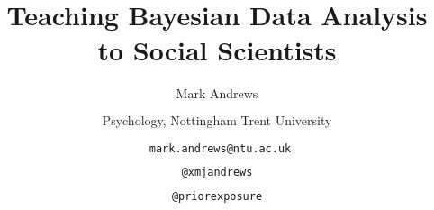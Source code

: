 \documentclass{slides}
\title[Teaching Bayes]{Teaching Bayesian Data Analysis to Social Scientists}
\author[Andrews]{Mark Andrews \\ $\phantom{foo}$ \\ Psychology, Nottingham Trent University \\ $\phantom{foo}$ \\ \faEnvelopeO \  \texttt{mark.andrews@ntu.ac.uk} \\ $\phantom{foo}$ \\ \faTwitter \texttt{@xmjandrews} \\ $\phantom{foo}$ \\ \faTwitter \texttt{@priorexposure}}
\date{}
\begin{document}
{
	\begin{frame}
		\titlepage
	\end{frame}
}




\end{document}
